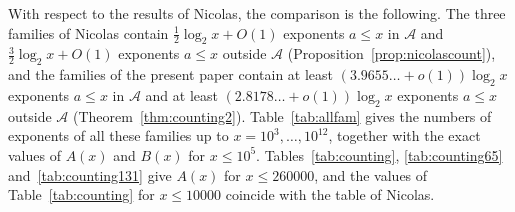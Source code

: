 \documentclass[11pt]{amsart}
\theoremstyle{definition}
\begin{document}
With respect to the results of Nicolas, the comparison is the following. The three families of Nicolas contain $\frac12\log_2x+O(1)$ exponents $a\le x$ in $\mathcal{A}$ and $\frac32\log_2x+O(1)$ exponents $a\le x$ outside $\mathcal{A}$ (Proposition~\ref{prop:nicolascount}), and the families of the present paper contain at least $(3.9655\ldots+o(1))\log_2x$ exponents $a\le x$ in $\mathcal{A}$ and at least $(2.8178\ldots+o(1))\log_2x$ exponents $a\le x$ outside $\mathcal{A}$ (Theorem~\ref{thm:counting2}). Table~\ref{tab:allfam} gives the numbers of exponents of all these families up to $x=10^3,\dots,10^{12}$, together with the exact values of $A(x)$ and $B(x)$ for $x\le10^5$. Tables~\ref{tab:counting}, \ref{tab:counting65} and~\ref{tab:counting131} give $A(x)$ for $x\le260000$, and the values of Table~\ref{tab:counting} for $x\le10000$ coincide with the table of Nicolas.
\end{document}
